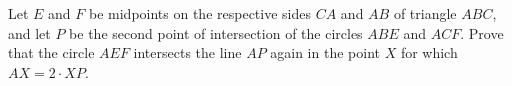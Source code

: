 Let $E$ and $F$ be midpoints on the respective sides $CA$ and $AB$ of triangle $ABC$, and
let $P$ be the second point of intersection of the circles $ABE$ and $ACF$. Prove that
the circle $AEF$ intersects the line $AP$ again in the point $X$ for which $AX = 2 \cdot XP$.
